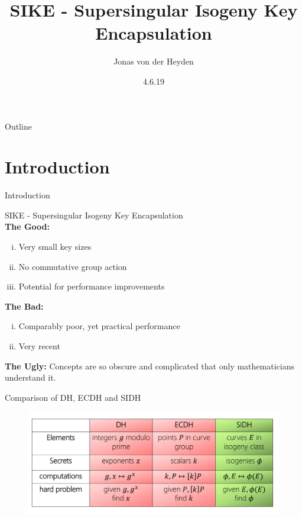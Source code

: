 \documentclass{beamer}
\title[SIKE]{SIKE - Supersingular Isogeny Key Encapsulation}
\author{Jonas von der Heyden}
\institute{FU Berlin}
\date{4.6.19}
\begin{document}
\newcommand{\source}[1]{\caption*{Source: {#1}} } %
\begin{frame}
  \titlepage
\end{frame}

\begin{frame}{Outline}
  \tableofcontents
\end{frame}

\section{Introduction}

\begin{frame}{Introduction}

SIKE - Supersingular Isogeny Key Encapsulation\\
\vspace{5mm}
\textbf{The Good:}
\begin{enumerate}[(i)]
	\item Very small key sizes\pause
	\item No commutative group action\pause
	\item Potential for performance improvements\pause
\end{enumerate}
\vspace{5mm}
\textbf{The Bad:}
\begin{enumerate}[(i)]
	\item Comparably poor, yet practical performance\pause
	\item Very recent\pause
\end{enumerate}

\vfill
\textbf{The Ugly:} Concepts are so obscure and complicated that only mathematicians understand it.


\end{frame}
\begin{frame}{Comparison of DH, ECDH and SIDH}
\begin{figure} %
	\centering
	\includegraphics[width=1\linewidth]{dh_ec_iso}
	\label{fig:dh_ec_iso}
\end{figure}
\end{frame}
\end{document}
